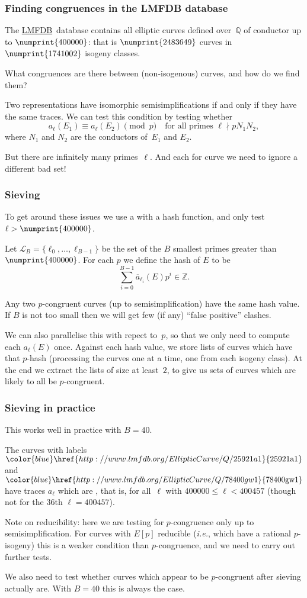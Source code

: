 \documentclass[compress]{beamer}
\newcommand{\Q}{\mathbb Q}
\newcommand{\Z}{\mathbb Z}
\newcommand{\LL}{\mathcal L}
\newcommand{\lmfdbec}[3]{\color{blue}\href{http://www.lmfdb.org/EllipticCurve/Q/#1#2#3}{{\text{\rm#1#2#3}}}}
\newcommand{\LMFDB}{\href{http://www.lmfdb.org/EllipticCurve/Q}{\color{blue}LMFDB}}
\newcommand{\high}[1]{\emph{\color{blue}{#1}}}
\begin{document}
\begin{frame}\frametitle{Finding congruences in the LMFDB database}
The \LMFDB\ database contains all elliptic curves defined over~$\Q$ of
conductor up to $\numprint{400000}$: that is $\numprint{2483649}$
curves in $\numprint{1741002}$ isogeny classes.

What congruences are there between (non-isogenous) curves, and how do
we find them?

Two representations have isomorphic semisimplifications if and only if
they have the same traces. We can test this condition by testing
whether
\[ a_{\ell}(E_1)\equiv a_{\ell}(E_2)\pmod{p}
\quad \text{for all primes } \ell \nmid pN_1N_2,
\] 
where $N_1$ and $N_2$ are the conductors of~$E_1$ and $E_2$.

But there are infinitely many primes~$\ell$.  And each for curve we need to
ignore a different bad set!
\end{frame}

\begin{frame}\frametitle{Sieving}
  To get around these issues we use a \high{sieve} with a hash
  function, and only test $\ell>\numprint{400000}$.

  Let $\LL_B=\{\ell_0,\dots,\ell_{B-1}\}$ be the set of the $B$
  smallest primes greater than $\numprint{400000}$.  For each $p$ we
  define the hash of $E$ to be
  \[\sum_{i=0}^{B-1}\overline{a}_{\ell_i}(E)p^i\in\Z.\]

 Any two $p$-congruent curves (up to semisimplification) have the same
 hash value.  If $B$ is not too small then we will get few (if any)
 ``false positive'' clashes.

  We can also parallelise this with repect to~$p$, so that we only
  need to compute each $a_{\ell}(E)$ once.  Against each hash value,
  we store lists of curves which have that $p$-hash (processing the
  curves one at a time, one from each isogeny class).  At the end we
  extract the lists of size at least~$2$, to give us sets of curves
  which are likely to all be $p$-congruent. %

\end{frame}

\begin{frame}\frametitle{Sieving in practice}
  This works well in practice with $B=40$.

  \pause
  \medskip
  The curves with labels $\lmfdbec{25921}{a}{1}$ and
  $\lmfdbec{78400}{gw}{1}$ have traces $a_{\ell}$ which are \high{equal
    for all~$\ell\in\LL_{35}$}, that is, for all~$\ell$ with
  $400000\le \ell<400457$ (though not for the 36th $\ell=400457$).
  \pause
  \medskip

  Note on reducibility: here we are testing for $p$-congruence only up
  to semisimplification.  For curves with $E[p]$ reducible
  (\textit{i.e.}, which have a rational $p$-isogeny) this is a weaker
  condition than $p$-congruence, and we need to carry out further
  tests.

    \pause
  \medskip
  We also need to test whether curves which appear to be $p$-congruent
  after sieving actually are.  With $B=40$ this is always the case.
\end{frame}
\end{document}
